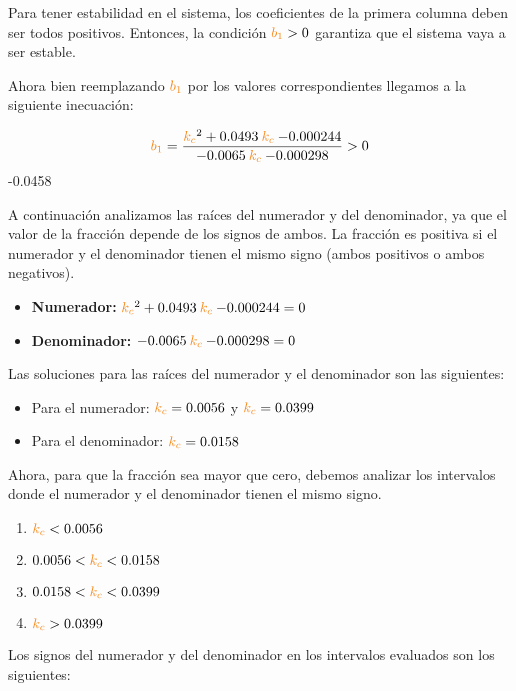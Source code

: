 Para tener estabilidad en el sistema, los coeficientes de la primera columna
deben ser todos positivos. Entonces, la condición $\nara{b_1} > 0$ garantiza
que el sistema vaya a ser estable.

Ahora bien reemplazando $\nara{b_1}$ por los valores correspondientes llegamos a la siguiente inecuación:

\begin{equation}
    \nara{b_1} = \frac{\nara{k_c}^2  +0.0493 \nara{k_c}  -0.000244}{-0.0065 \nara{k_c}  -0.000298} > 0
\end{equation}
-0.0458


A continuación analizamos las raíces del numerador y del denominador, ya que el valor de la fracción depende de los signos de ambos. La fracción es positiva si el numerador y el denominador tienen el mismo signo (ambos positivos o ambos negativos).

\begin{itemize}
    \item \textbf{Numerador:} \( \nara{k_c}^2  +0.0493 \nara{k_c}  -0.000244 = 0 \)
    \item \textbf{Denominador:} \(-0.0065 \nara{k_c}  -0.000298 = 0 \)
\end{itemize}

Las soluciones para las raíces del numerador y el denominador son las siguientes:

\begin{itemize}
    \item Para el numerador: \( \nara{k_c} = 0.0056 \) y \( \nara{k_c} = 0.0399 \)
    \item Para el denominador: \( \nara{k_c} = 0.0158 \)
\end{itemize}

Ahora, para que la fracción sea mayor que cero, debemos analizar los intervalos donde el numerador y el denominador tienen el mismo signo.

\begin{enumerate}
    \item \( \nara{k_c} < 0.0056 \)
    \item \( 0.0056 < \nara{k_c} < 0.0158 \)
    \item \( 0.0158 < \nara{k_c} < 0.0399 \)
    \item \( \nara{k_c} > 0.0399 \)
\end{enumerate}

Los signos del numerador y del denominador en los intervalos evaluados son los siguientes:

